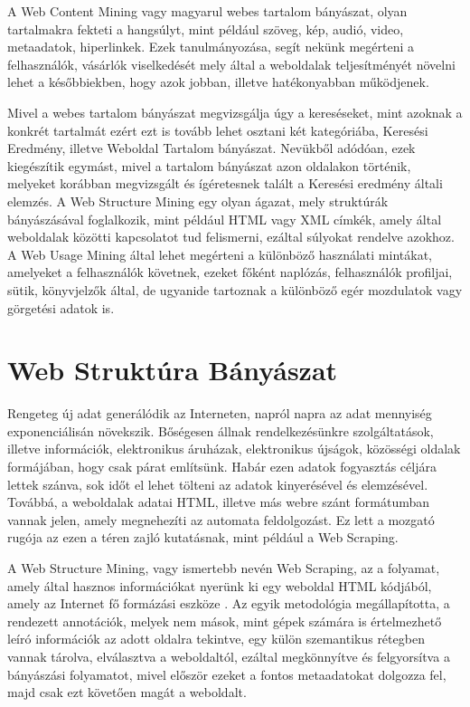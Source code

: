 A Web Content Mining vagy magyarul webes tartalom bányászat, olyan tartalmakra fekteti a hangsúlyt, mint például szöveg, kép, audió, video, metaadatok, hiperlinkek. Ezek tanulmányozása, segít nekünk megérteni a felhasználók, vásárlók viselkedését mely által a weboldalak teljesítményét növelni lehet a későbbiekben, hogy azok jobban, illetve hatékonyabban működjenek. 

Mivel a webes tartalom bányászat megvizsgálja úgy a kereséseket, mint azoknak a konkrét tartalmát ezért ezt is tovább lehet osztani két kategóriába, Keresési Eredmény, illetve Weboldal Tartalom bányászat. Nevükből adódóan, ezek kiegészítik egymást, mivel a tartalom bányászat azon oldalakon történik, melyeket korábban megvizsgált és ígéretesnek talált a Keresési eredmény általi elemzés. A Web Structure Mining egy olyan ágazat, mely struktúrák bányászásával foglalkozik, mint például HTML vagy XML címkék, amely által weboldalak közötti kapcsolatot tud felismerni, ezáltal súlyokat rendelve azokhoz. A Web Usage Mining által lehet megérteni a különböző használati mintákat, amelyeket a felhasználók követnek, ezeket főként naplózás, felhasználók profiljai, sütik, könyvjelzők által, de ugyanide tartoznak a különböző egér mozdulatok vagy görgetési adatok is.

\section{Web Struktúra Bányászat}

Rengeteg új adat generálódik az Interneten, napról napra az adat mennyiség exponenciálisán növekszik. Bőségesen állnak rendelkezésünkre szolgáltatások, illetve információk, elektronikus áruházak, elektronikus újságok, közösségi oldalak formájában, hogy csak párat említsünk. Habár ezen adatok fogyasztás céljára lettek szánva, sok időt el lehet tölteni az adatok kinyerésével és elemzésével. Továbbá, a weboldalak adatai HTML, illetve más webre szánt formátumban vannak jelen, amely megnehezíti az automata feldolgozást. Ez lett a mozgató rugója az ezen a téren zajló kutatásnak, mint például a Web Scraping.

A Web Structure Mining, vagy ismertebb nevén Web Scraping, az a folyamat, amely által hasznos információkat nyerünk ki egy weboldal HTML kódjából, amely az Internet fő formázási eszköze \cite{dastidar2016intelligent}. Az egyik metodológia megállapította, a rendezett annotációk, melyek nem mások, mint gépek számára is értelmezhető leíró információk az adott oldalra tekintve, egy külön szemantikus rétegben vannak tárolva, elválasztva a weboldaltól, ezáltal megkönnyítve és felgyorsítva a bányászási folyamatot, mivel először ezeket a fontos metaadatokat dolgozza fel, majd csak ezt követően magát a weboldalt.

